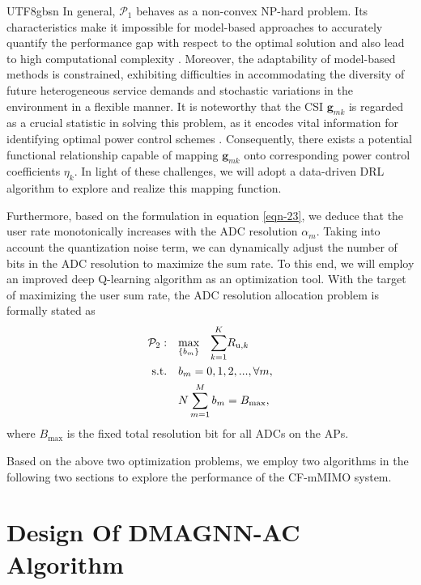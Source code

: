 \documentclass[lettersize,journal]{IEEEtran}
\begin{document}
\begin{CJK}{UTF8}{gbsn}
In general, $\mathcal{P}_1$ behaves as a non-convex NP-hard problem. Its characteristics make it impossible for model-based approaches to accurately quantify the performance gap with respect to the optimal solution and also lead to high computational complexity \cite{paper6}. Moreover, the adaptability of model-based methods is constrained, exhibiting difficulties in accommodating the diversity of future heterogeneous service demands and stochastic variations in the environment in a flexible manner. It is noteworthy that the CSI $\mathbf{g} _{mk}$ is regarded as a crucial statistic in solving this problem, as it encodes vital information for identifying optimal power control schemes \cite{paperIA17}. Consequently, there exists a potential functional relationship capable of mapping $\mathbf{g}_{mk}$ onto corresponding power control coefficients $\eta_k$. In light of these challenges, we will adopt a data-driven DRL algorithm to explore and realize this mapping function.

Furthermore, based on the formulation in equation \eqref{eqn-23}, we deduce that the user rate monotonically increases with the ADC resolution $\alpha_m$. Taking into account the quantization noise term, we can dynamically adjust the number of bits in the ADC resolution to maximize the sum rate. To this end, we will employ an improved deep Q-learning algorithm as an optimization tool. With the target of maximizing the user sum rate, the ADC resolution allocation problem is formally stated as
\begin{align}\label{P2}
\mathcal{P}_2 :&\quad\underset{\left \{ b_m \right \} }{\text{max}} \quad  {\sum_{k=1}^{K}} R_{\text{u},k}\\
\text{s.t.}&\quad   b_m=0,1,2,...,  \forall m, \\
\quad & \quad N\sum_{m=1}^{M} b_m=B_\text{\text{max}},
\end{align}
where $B_\text{max}$ is the fixed total resolution bit for all ADCs on the APs.

Based on the above two optimization problems, we employ two algorithms in the following two sections to explore the performance of the CF-mMIMO system.

\section{Design Of DMAGNN-AC Algorithm}


\end{CJK}
\end{document}
